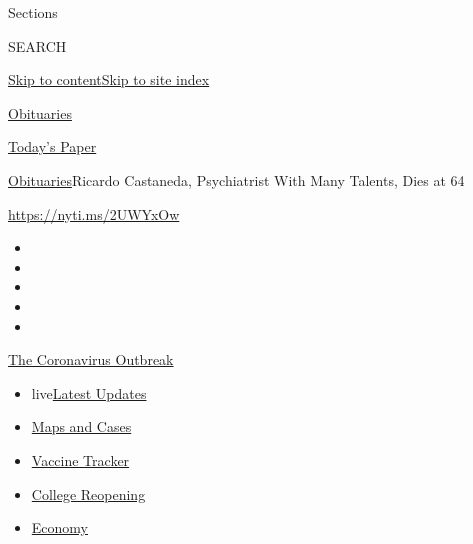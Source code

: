 Sections

SEARCH

\protect\hyperlink{site-content}{Skip to
content}\protect\hyperlink{site-index}{Skip to site index}

\href{https://www.nytimes3xbfgragh.onion/section/obituaries}{Obituaries}

\href{https://myaccount.nytimes3xbfgragh.onion/auth/login?response_type=cookie\&client_id=vi}{}

\href{https://www.nytimes3xbfgragh.onion/section/todayspaper}{Today's
Paper}

\href{/section/obituaries}{Obituaries}\textbar{}Ricardo Castaneda,
Psychiatrist With Many Talents, Dies at 64

\url{https://nyti.ms/2UWYxOw}

\begin{itemize}
\item
\item
\item
\item
\item
\end{itemize}

\href{https://www.nytimes3xbfgragh.onion/news-event/coronavirus?action=click\&pgtype=Article\&state=default\&region=TOP_BANNER\&context=storylines_menu}{The
Coronavirus Outbreak}

\begin{itemize}
\tightlist
\item
  live\href{https://www.nytimes3xbfgragh.onion/2020/08/04/world/coronavirus-covid-19.html?action=click\&pgtype=Article\&state=default\&region=TOP_BANNER\&context=storylines_menu}{Latest
  Updates}
\item
  \href{https://www.nytimes3xbfgragh.onion/interactive/2020/us/coronavirus-us-cases.html?action=click\&pgtype=Article\&state=default\&region=TOP_BANNER\&context=storylines_menu}{Maps
  and Cases}
\item
  \href{https://www.nytimes3xbfgragh.onion/interactive/2020/science/coronavirus-vaccine-tracker.html?action=click\&pgtype=Article\&state=default\&region=TOP_BANNER\&context=storylines_menu}{Vaccine
  Tracker}
\item
  \href{https://www.nytimes3xbfgragh.onion/2020/08/02/us/covid-college-reopening.html?action=click\&pgtype=Article\&state=default\&region=TOP_BANNER\&context=storylines_menu}{College
  Reopening}
\item
  \href{https://www.nytimes3xbfgragh.onion/live/2020/08/03/business/stock-market-today-coronavirus?action=click\&pgtype=Article\&state=default\&region=TOP_BANNER\&context=storylines_menu}{Economy}
\end{itemize}

